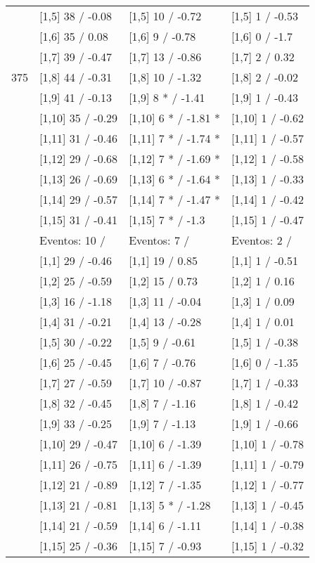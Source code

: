 \begin{table}
\begin{tabular}[t]{llll}
 & {}[1,5] 38  / -0.08 & {}[1,5] 10  / -0.72 & {}[1,5] 1  / -0.53\\
 & {}[1,6] 35  / 0.08 & {}[1,6] 9  / -0.78 & {}[1,6] 0  / -1.7\\
 & {}[1,7] 39  / -0.47 & {}[1,7] 13  / -0.86 & {}[1,7] 2  / 0.32\\
375 & {}[1,8] 44  / -0.31 & {}[1,8] 10  / -1.32 & {}[1,8] 2  / -0.02\\
\addlinespace
 & {}[1,9] 41  / -0.13 & {}[1,9] 8 * / -1.41 & {}[1,9] 1  / -0.43\\
 & {}[1,10] 35  / -0.29 & {}[1,10] 6 * / -1.81 * & {}[1,10] 1  / -0.62\\
 & {}[1,11] 31  / -0.46 & {}[1,11] 7 * / -1.74 * & {}[1,11] 1  / -0.57\\
 & {}[1,12] 29  / -0.68 & {}[1,12] 7 * / -1.69 * & {}[1,12] 1  / -0.58\\
 & {}[1,13] 26  / -0.69 & {}[1,13] 6 * / -1.64 * & {}[1,13] 1  / -0.33\\
\addlinespace
 & {}[1,14] 29  / -0.57 & {}[1,14] 7 * / -1.47 * & {}[1,14] 1  / -0.42\\
 & {}[1,15] 31  / -0.41 & {}[1,15] 7 * / -1.3 & {}[1,15] 1  / -0.47\\
 & Eventos:  10 / & Eventos:  7 / & Eventos:  2 /\\
 & {}[1,1] 29  / -0.46 & {}[1,1] 19  / 0.85 & {}[1,1] 1  / -0.51\\
 & {}[1,2] 25  / -0.59 & {}[1,2] 15  / 0.73 & {}[1,2] 1  / 0.16\\
\addlinespace
 & {}[1,3] 16  / -1.18 & {}[1,3] 11  / -0.04 & {}[1,3] 1  / 0.09\\
 & {}[1,4] 31  / -0.21 & {}[1,4] 13  / -0.28 & {}[1,4] 1  / 0.01\\
 & {}[1,5] 30  / -0.22 & {}[1,5] 9  / -0.61 & {}[1,5] 1  / -0.38\\
 & {}[1,6] 25  / -0.45 & {}[1,6] 7  / -0.76 & {}[1,6] 0  / -1.35\\
 & {}[1,7] 27  / -0.59 & {}[1,7] 10  / -0.87 & {}[1,7] 1  / -0.33\\
\addlinespace
500 & {}[1,8] 32  / -0.45 & {}[1,8] 7  / -1.16 & {}[1,8] 1  / -0.42\\
 & {}[1,9] 33  / -0.25 & {}[1,9] 7  / -1.13 & {}[1,9] 1  / -0.66\\
 & {}[1,10] 29  / -0.47 & {}[1,10] 6  / -1.39 & {}[1,10] 1  / -0.78\\
 & {}[1,11] 26  / -0.75 & {}[1,11] 6  / -1.39 & {}[1,11] 1  / -0.79\\
 & {}[1,12] 21  / -0.89 & {}[1,12] 7  / -1.35 & {}[1,12] 1  / -0.77\\
\addlinespace
 & {}[1,13] 21  / -0.81 & {}[1,13] 5 * / -1.28 & {}[1,13] 1  / -0.45\\
 & {}[1,14] 21  / -0.59 & {}[1,14] 6  / -1.11 & {}[1,14] 1  / -0.38\\
 & {}[1,15] 25  / -0.36 & {}[1,15] 7  / -0.93 & {}[1,15] 1  / -0.32\\
\bottomrule
\end{tabular}
\end{table}
